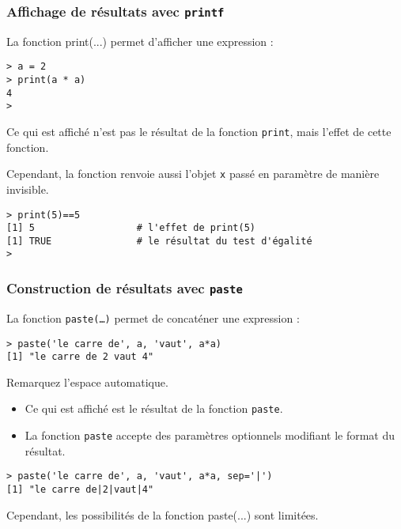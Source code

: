 \documentclass[10pt]{beamer}
\begin{document}
\begin{frame}[fragile]
  \frametitle{Affichage de résultats avec \texttt{printf}}
  La fonction print(...) permet d'afficher une expression :
  \begin{lstlisting}
> a = 2
> print(a * a)
4
>
\end{lstlisting}

Ce qui est affiché n'est pas le résultat de la fonction \texttt{print}, mais l'effet de cette fonction.

Cependant, la fonction renvoie aussi l'objet \texttt{x} passé en paramètre de manière invisible.
\begin{lstlisting}
> print(5)==5
[1] 5                  # l'effet de print(5)
[1] TRUE               # le résultat du test d'égalité
>  
\end{lstlisting}
\end{frame}


\begin{frame}[fragile]
\frametitle{Construction de résultats avec \texttt{paste}}
La fonction \texttt{paste(\dots)} permet de concaténer une expression :
\begin{lstlisting}
> paste('le carre de', a, 'vaut', a*a)
[1] "le carre de 2 vaut 4"  
\end{lstlisting}
Remarquez l'espace automatique.

\begin{itemize}
\item Ce qui est affiché est le \alert{résultat} de la fonction \texttt{paste}.
\item La fonction \texttt{paste} accepte des paramètres optionnels modifiant le format du résultat.
\end{itemize}
\begin{lstlisting}
> paste('le carre de', a, 'vaut', a*a, sep='|')
[1] "le carre de|2|vaut|4"
\end{lstlisting}
Cependant, les possibilités de la fonction paste(...) sont limitées.
  
\end{frame}
\end{document}
